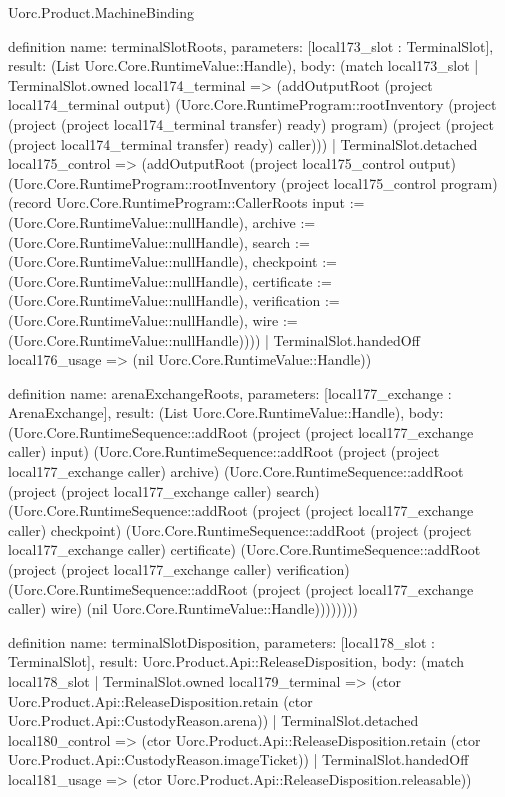 \begin{lexlean}{Uorc.Product.MachineBinding}
\begin{semanticmodule}
definition{
  name: terminalSlotRoots,
  parameters: [local173_slot : TerminalSlot],
  result: (List Uorc.Core.RuntimeValue::Handle),
  body: (match local173_slot
    | TerminalSlot.owned local174_terminal => (addOutputRoot (project local174_terminal output) (Uorc.Core.RuntimeProgram::rootInventory (project (project (project local174_terminal transfer) ready) program) (project (project (project local174_terminal transfer) ready) caller)))
    | TerminalSlot.detached local175_control => (addOutputRoot (project local175_control output) (Uorc.Core.RuntimeProgram::rootInventory (project local175_control program) (record Uorc.Core.RuntimeProgram::CallerRoots {input := (Uorc.Core.RuntimeValue::nullHandle), archive := (Uorc.Core.RuntimeValue::nullHandle), search := (Uorc.Core.RuntimeValue::nullHandle), checkpoint := (Uorc.Core.RuntimeValue::nullHandle), certificate := (Uorc.Core.RuntimeValue::nullHandle), verification := (Uorc.Core.RuntimeValue::nullHandle), wire := (Uorc.Core.RuntimeValue::nullHandle)})))
    | TerminalSlot.handedOff local176_usage => (nil Uorc.Core.RuntimeValue::Handle))
}

definition{
  name: arenaExchangeRoots,
  parameters: [local177_exchange : ArenaExchange],
  result: (List Uorc.Core.RuntimeValue::Handle),
  body: (Uorc.Core.RuntimeSequence::addRoot (project (project local177_exchange caller) input) (Uorc.Core.RuntimeSequence::addRoot (project (project local177_exchange caller) archive) (Uorc.Core.RuntimeSequence::addRoot (project (project local177_exchange caller) search) (Uorc.Core.RuntimeSequence::addRoot (project (project local177_exchange caller) checkpoint) (Uorc.Core.RuntimeSequence::addRoot (project (project local177_exchange caller) certificate) (Uorc.Core.RuntimeSequence::addRoot (project (project local177_exchange caller) verification) (Uorc.Core.RuntimeSequence::addRoot (project (project local177_exchange caller) wire) (nil Uorc.Core.RuntimeValue::Handle))))))))
}

definition{
  name: terminalSlotDisposition,
  parameters: [local178_slot : TerminalSlot],
  result: Uorc.Product.Api::ReleaseDisposition,
  body: (match local178_slot
    | TerminalSlot.owned local179_terminal => (ctor Uorc.Product.Api::ReleaseDisposition.retain (ctor Uorc.Product.Api::CustodyReason.arena))
    | TerminalSlot.detached local180_control => (ctor Uorc.Product.Api::ReleaseDisposition.retain (ctor Uorc.Product.Api::CustodyReason.imageTicket))
    | TerminalSlot.handedOff local181_usage => (ctor Uorc.Product.Api::ReleaseDisposition.releasable))
}


\end{semanticmodule}
\end{lexlean}
